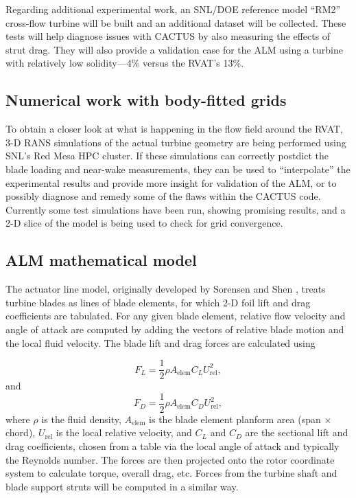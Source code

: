 Regarding additional experimental work, an SNL/DOE reference model ``RM2''
cross-flow turbine will be built and an additional dataset will be collected.
These tests will help diagnose issues with CACTUS by also measuring the effects
of strut drag. They will also provide a validation case for the ALM using a
turbine with relatively low solidity---4\% versus the RVAT's 13\%.

\subsection{Numerical work with body-fitted grids}

To obtain a closer look at what is happening in the flow field around the RVAT,
3-D RANS simulations of the actual turbine geometry are being performed using
SNL's Red Mesa HPC cluster. If these simulations can correctly postdict the
blade loading and near-wake measurements, they can be used to ``interpolate''
the experimental results and provide more insight for validation of the ALM, or
to possibly diagnose and remedy some of the flaws within the CACTUS code.
Currently some test simulations have been run, showing promising results, and a
2-D slice of the model is being used to check for grid convergence.

\subsection{ALM mathematical model}

The actuator line model, originally developed by Sorensen and Shen
\cite{Sorensen2002}, treats turbine blades as lines of blade elements, for which
2-D foil lift and drag coefficients are tabulated. For any given blade element,
relative flow velocity and angle of attack are computed by adding the vectors
of relative blade motion and the local fluid velocity. The blade lift and drag
forces are calculated using

\begin{equation}
F_L = \frac{1}{2} \rho A_\mathrm{elem} C_L U_\mathrm{rel}^2,
\end{equation}
and
\begin{equation}
F_D = \frac{1}{2} \rho A_\mathrm{elem} C_D U_\mathrm{rel}^2,
\end{equation}
where $\rho$ is the fluid density, $A_\mathrm{elem}$ is the blade element
planform area (span $\times$ chord), $U_\mathrm{rel}$ is the local relative
velocity, and $C_L$ and $C_D$ are the sectional lift and drag coefficients,
chosen from a table via the local angle of attack and typically the Reynolds
number. The forces are then projected onto the rotor coordinate system to
calculate torque, overall drag, etc. Forces from the turbine shaft and blade
support struts will be computed in a similar way.

